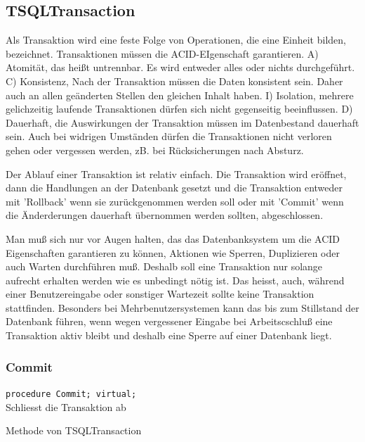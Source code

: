 \subsection{TSQLTransaction}
Als Transaktion wird eine feste Folge von Operationen, die eine Einheit bilden, bezeichnet. Transaktionen müssen die ACID-EIgenschaft garantieren. A) Atomität, das heißt untrennbar. Es wird entweder alles oder nichts durchgeführt. C) Konsistenz, Nach der Transaktion müssen die Daten konsistent sein. Daher auch an allen geänderten Stellen den gleichen Inhalt haben. I) Isolation, mehrere gelichzeitig laufende Transaktionen dürfen sich nicht gegenseitig beeinflussen. D) Dauerhaft, die Auswirkungen der Transaktion müssen im Datenbestand dauerhaft sein. Auch bei widrigen Umständen dürfen die Transaktionen nicht verloren gehen oder vergessen werden, zB. bei Rücksicherungen nach Absturz.

Der Ablauf einer Transaktion ist relativ einfach. Die Transaktion wird eröffnet, dann die Handlungen an der Datenbank gesetzt und die Transaktion entweder mit 'Rollback' wenn sie zurückgenommen werden soll oder mit 'Commit' wenn die Änderderungen dauerhaft übernommen werden sollten, abgeschlossen.  

Man muß sich nur vor Augen halten, das das Datenbanksystem um die ACID Eigenschaften garantieren zu können, Aktionen wie Sperren, Duplizieren oder auch Warten durchführen muß. Deshalb soll eine Transaktion nur solange aufrecht erhalten werden wie es unbedingt nötig ist. Das heisst, auch, während einer Benutzereingabe oder sonstiger Wartezeit sollte keine Transaktion stattfinden. Besonders bei Mehrbenutzersystemen kann das bis zum Stillstand der Datenbank führen, wenn wegen vergessener Eingabe bei Arbeitscschluß eine Transaktion aktiv bleibt und deshalb eine Sperre auf einer Datenbank liegt.

\subsubsection{Commit}
\begin{description}
  \item \texttt{procedure Commit; virtual;}\\Schliesst die Transaktion ab
  \begin{description}
    \item Methode von TSQLTransaction
  \end{description}
\end{description}

